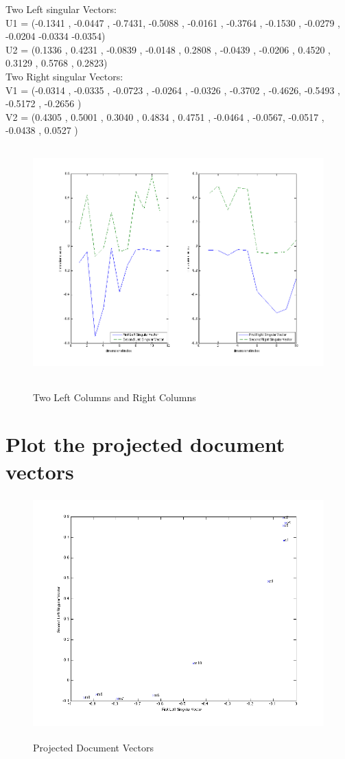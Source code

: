 \documentclass[11pt,a4paper]{article}
\begin{document}
Two Left singular Vectors: \\
U1 = 
(-0.1341 ,  -0.0447 ,  -0.7431,   -0.5088  , -0.0161 ,  -0.3764  , -0.1530 ,
-0.0279  , -0.0204   -0.0334   -0.0354) \\
U2 =
(0.1336 ,   0.4231 ,  -0.0839 ,  -0.0148  ,  0.2808  , -0.0439  , -0.0206 ,
0.4520 ,   0.3129  ,  0.5768  ,  0.2823) \\[0.3cm]
Two Right singular Vectors: \\
V1 = 
(-0.0314 ,  -0.0335  , -0.0723 ,  -0.0264  , -0.0326 ,  -0.3702 ,  -0.4626,
-0.5493  , -0.5172  , -0.2656 )\\
V2 = 
    (0.4305  ,  0.5001 ,   0.3040  ,  0.4834   , 0.4751  , -0.0464 ,  -0.0567,
    -0.0517  , -0.0438  ,  0.0527 )\\

\begin{figure}[h]
    \centering
    \includegraphics[width=7in,height=3.5in]{./4s.png} \\
    \caption{Two Left Columns and Right Columns}
\end{figure}

\newpage

\section{Plot the projected document vectors}
\begin{figure}[h]
    \centering
    \includegraphics[width=7in,height=3.5in]{./5s.png} \\
    \caption{Projected Document Vectors}
\end{figure}
\end{document}
